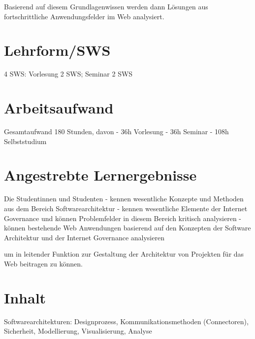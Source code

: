 Basierend auf diesem Grundlagenwissen werden dann Lösungen aus
fortschrittliche Anwendungsfelder im Web analysiert.

\section*{Lehrform/SWS
\label{/mi-2017/modulbeschreibungen-master/MA_WTW_Modul_Web-Architekturen}}\label{lehrformsws-pathlabelmi-2017modulbeschreibungen-mastermaux5fwtwux5fmodulux5fweb-architekturen}

4 SWS: Vorlesung 2 SWS; Seminar 2 SWS

\section*{Arbeitsaufwand
\label{/mi-2017/modulbeschreibungen-master/MA_WTW_Modul_Web-Architekturen}}\label{arbeitsaufwand-pathlabelmi-2017modulbeschreibungen-mastermaux5fwtwux5fmodulux5fweb-architekturen}

Gesamtaufwand 180 Stunden, davon - 36h Vorlesung - 36h Seminar - 108h
Selbststudium

\section*{Angestrebte
Lernergebnisse\label{/mi-2017/modulbeschreibungen-master/MA_WTW_Modul_Web-Architekturen}}\label{angestrebte-lernergebnissepathlabelmi-2017modulbeschreibungen-mastermaux5fwtwux5fmodulux5fweb-architekturen}

Die Studentinnen und Studenten - kennen wesentliche Konzepte und
Methoden aus dem Bereich Softwarearchitektur - kennen wesentliche
Elemente der Internet Governance und können Problemfelder in diesem
Bereich kritisch analysieren - können bestehende Web Anwendungen
basierend auf den Konzepten der Software Architektur und der Internet
Governance analysieren

um in leitender Funktion zur Gestaltung der Architektur von Projekten
für das Web beitragen zu können.

\section*{Inhalt\label{/mi-2017/modulbeschreibungen-master/MA_WTW_Modul_Web-Architekturen}}\label{inhaltpathlabelmi-2017modulbeschreibungen-mastermaux5fwtwux5fmodulux5fweb-architekturen}

Softwarearchitekturen: Designprozess, Kommunikationsmethoden
(Connectoren), Sicherheit, Modellierung, Visualisierung, Analyse

